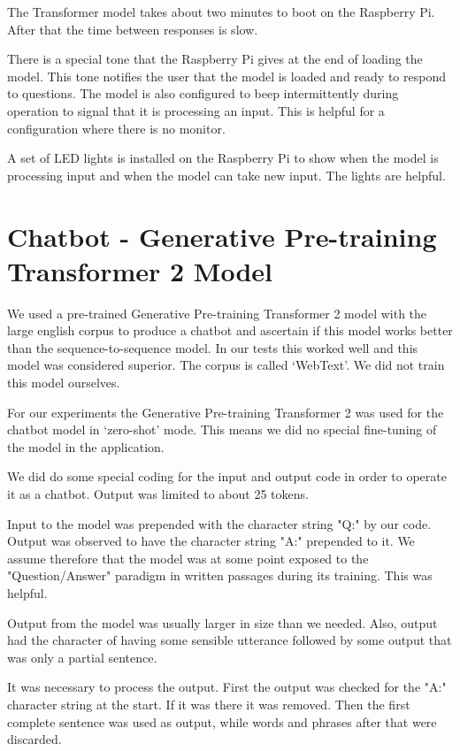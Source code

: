 The Transformer model takes about two minutes to boot on the Raspberry Pi. After that the time between responses is slow. 

There is a special tone that the Raspberry Pi gives at the end of loading the model. This tone notifies the user that the model is loaded and ready to respond to questions. The model is also configured to beep intermittently during operation to signal that it is processing an input. This is helpful for a configuration where there is no monitor.

A set of LED lights is installed on the Raspberry Pi to show when the model is processing input and when the model can take new input. The lights are helpful.


\section{Chatbot - Generative Pre-training Transformer 2 Model}

\label{install-gpt2-chatbot}
We used a pre-trained Generative Pre-training Transformer 2 model with the large english corpus to produce a chatbot and ascertain if this model works better than the sequence-to-sequence model. In our tests this worked well and this model was considered superior. The corpus is called `WebText'. We did not train this model ourselves.

For our experiments the Generative Pre-training Transformer 2 was used for the chatbot model in `zero-shot' mode. This means we did no special fine-tuning of the model in the application.

We did do some special coding for the input and output code in order to operate it as a chatbot. Output was limited to about 25 tokens. 

Input to the model was prepended with the character string "Q:" by our code. Output was observed to have the character string "A:" prepended to it. We assume therefore that the model was at some point exposed to the "Question/Answer" paradigm in written passages during its training. This was helpful.

Output from the model was usually larger in size than we needed. Also, output had the character of having some sensible utterance followed by some output that was only a partial sentence.

It was necessary to process the output. First the output was checked for the "A:" character string at the start. If it was there it was removed. Then the first complete sentence was used as output, while words and phrases after that were discarded.

